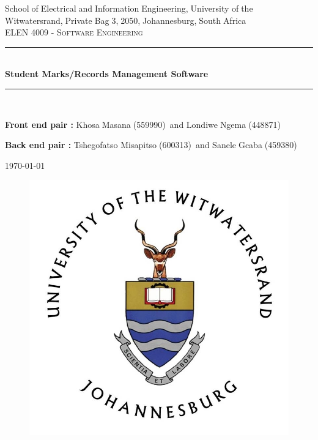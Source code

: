 \documentclass[10pt,onecolumn]{MainDocument}
\begin{document}
	\begin{titlepage}
		
		\newcommand{\HRule}{\rule{\linewidth}{0.5mm}} %
		
		\center %
		{\small School$\;$of$\;$Electrical$\;$and$\;$Information$\;$Engineering,$\;$University of$\;$the$\;$Witwatersrand,$\;$Private$\;$Bag$\;$3,$\;$2050,$\;$Johannesburg,$\;$South$\;$Africa}\\[1.5cm] %
		
		\textsc{ELEN 4009 - Software Engineering}\\[0.5cm] %
		
		\HRule \\[0.4cm]
		{ \large \bfseries Student Marks/Records Management Software}\\[0.4cm] %
		\HRule \\[1.5cm]
		
		\large
		
		\textbf{Front end pair :}
		Khosa$\;$Masana$\;$(559990)\ and
		Londiwe$\;$Ngema$\;$(448871)
		
		\textbf{Back end pair :}
		Tshegofatso Misapitso$\;$(600313)\ and
		Sanele$\;$Gcaba$\;$(459380)
		
		
		{\large \today}\\[3cm] %
		
		
		\begin{figure}[h]
        \begin{center}
        \includegraphics[scale=0.70]{Wits-logo1}
        \end{center}
        \end{figure}
		

\end{titlepage}
\end{document}
